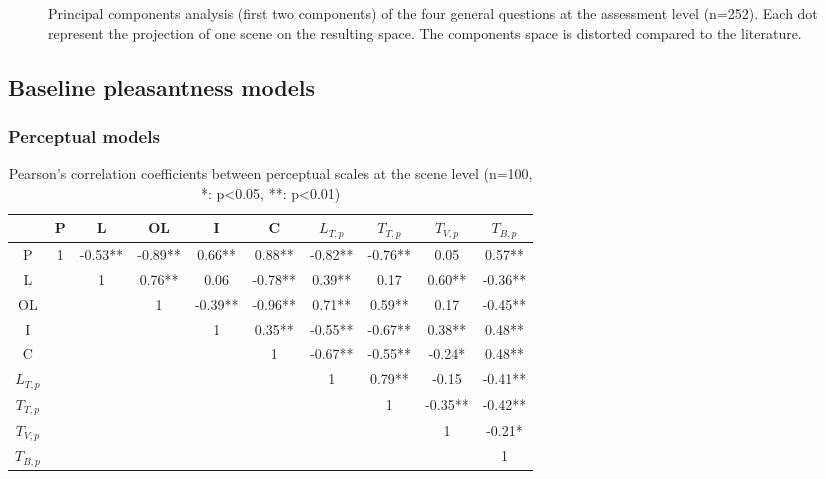 \documentclass[11pt,a4paper]{article}
\begin{document}
\begin{figure}[h]
\begin{subfigure}[t]{0.5\textwidth}
    \end{subfigure}
    \caption{Principal components analysis (first two components) of the four general questions at the assessment level (n=252). Each dot represent the projection of one scene on the resulting space. The components space is distorted compared to the literature.}\label{fig:pspace}
\end{figure}

\subsection{Baseline pleasantness models}
\label{sec:base}


\subsubsection{Perceptual models}
\label{sec:base_perc}

\begin{table}[h]
\centering
\caption{Pearson's correlation coefficients between perceptual scales at the scene level (n=100, *: p<0.05, **: p<0.01)}
\label{tab:percc}
\begin{tabular}{ c | c c c c c c c c c }
\hline
	 & P & L & OL & I & C & $L_{T, p}$ & $T_{T, p}$ & $T_{V, p}$ & $T_{B, p}$ \\ \hline
	P & 1 & -0.53** & -0.89** & 0.66** & 0.88** & -0.82** & -0.76** & 0.05 & 0.57** \\
	L &  & 1 & 0.76** & 0.06 & -0.78** & 0.39** & 0.17 & 0.60** & -0.36** \\
	OL &  &  & 1 & -0.39** & -0.96** & 0.71** & 0.59** & 0.17 & -0.45** \\
	I &  &  &  & 1 & 0.35** & -0.55** & -0.67** & 0.38** & 0.48** \\
	C &  &  &  &  & 1 & -0.67** & -0.55** & -0.24* & 0.48** \\
	$L_{T, p}$ &  &  &  &  &  & 1 & 0.79** & -0.15 & -0.41** \\
	$T_{T, p}$ &  &  &  &  &  &  & 1 & -0.35** & -0.42** \\
	$T_{V, p}$ &  &  &  &  &  &  &  & 1 & -0.21* \\
	$T_{B, p}$ &  &  &  &  &  &  &  &  & 1 \\ \hline
\end{tabular}
\end{table}
\end{document}
